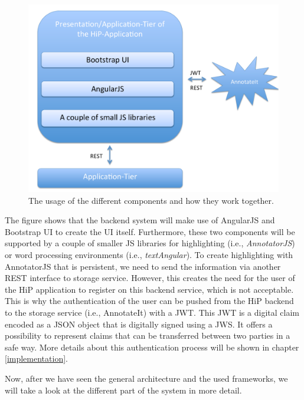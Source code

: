  \begin{figure}[th]
\centerline{\includegraphics[width=1\textwidth]{gfx/components}}
\caption{The usage of the different components and how they work together.}
\label{hip:components}
\end{figure}

The figure shows that the backend system will make use of AngularJS and Bootstrap UI to create the \ac{UI} itself. Furthermore, these two components will be supported by a couple of smaller \ac{JS} libraries for highlighting (i.e., \emph{AnnotatorJS}) or word processing environments (i.e., \emph{textAngular}). To create highlighting with AnnotatorJS that is persistent, we need to send the information via another \ac{REST} interface to storage service.
However, this creates the need for the user of the \ac{HiP} application to register on this backend service, which is not acceptable. This is why the authentication of the user can be pushed from the \ac{HiP} backend to the storage service (i.e., AnnotateIt) with a \ac{JWT}. This \ac{JWT} is a digital claim encoded as a \ac{JSON} object that is digitally signed using a \ac{JWS}. It offers a possibility to represent claims that can be transferred between two parties in a safe way. More details about this authentication process will be shown in chapter \ref{implementation}.

Now, after we have seen the general architecture and the used frameworks, we will take a look at the different part of the system in more detail.
 

